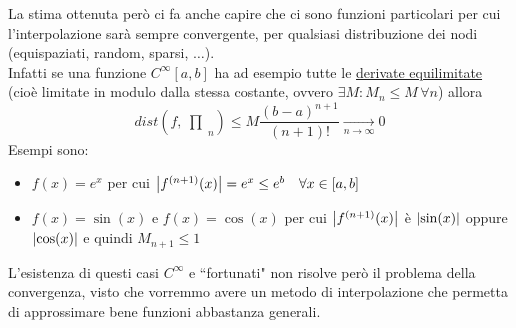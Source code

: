 \documentclass[12pt]{article}
\DeclarePairedDelimiter{\abs}{\lvert}{\rvert}
\newcommand{\inter}{\begin{matrix}\prod\end{matrix}}
\begin{document}
La stima ottenuta però ci fa anche capire che ci sono funzioni particolari per cui l'interpolazione sarà sempre convergente, per qualsiasi distribuzione dei nodi (equispaziati, random, sparsi, $\dotso$).\\
Infatti se una funzione $C^{\infty}[a,b]$ ha ad esempio tutte le \uline{derivate equilimitate} (cioè limitate in modulo dalla stessa costante, ovvero $\exists M : M_n \le M \, \forall n$) allora
\[dist\left(f,\inter_n \right) \le M \frac{(b-a)^{n+1}}{(n+1)!} \underset{n \to \infty}{\longrightarrow} 0\]
Esempi sono:
\begin{itemize}
    \item $f(x)=e^x$ per cui $\abs*{f^{(n+1)}(x)} = e^x \le e^b \quad \forall x \in [a,b]$
    \item $f(x)=\sin (x)$ e $f(x)=\cos (x)$ per cui $\abs*{f^{(n+1)}(x)}$ è $\abs*{\sin(x)}$ oppure $\abs*{\cos(x)}$ e quindi $M_{n+1} \le 1$
\end{itemize}
L'esistenza di questi casi $C^{\infty}$ e ``fortunati" non risolve però il problema della convergenza, visto che vorremmo avere un metodo di interpolazione che permetta di approssimare bene funzioni abbastanza generali.
\end{document}

